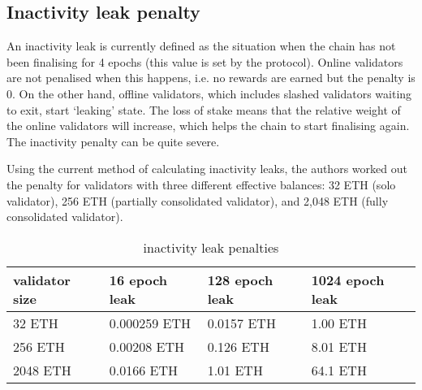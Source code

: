 \documentclass{article}
\begin{document}
\subsection{Inactivity leak penalty}
An inactivity leak is currently defined as the situation when the chain has not
been finalising for 4 epochs (this value is set by the protocol). Online
validators are not penalised when this happens, i.e. no rewards are earned but
the penalty is 0. On the other hand, offline validators, which includes slashed
validators waiting to exit, start `leaking' state. The loss of stake means that
the relative weight of the online validators will increase, which helps the
chain to start finalising again. The inactivity penalty can be quite severe. 

Using the current method of calculating inactivity leaks, the authors worked
out the penalty for validators with three different effective balances: 32 ETH
(solo validator), 256 ETH (partially consolidated validator),  and 2,048 ETH
(fully consolidated validator).

\begin{table}[htp]
\caption{inactivity leak penalties}
\begin{center}
\renewcommand{\arraystretch}{1.3}
\begin{tabular}{|l|l|l|l|}
\hline
\textbf{validator size} & \textbf{16 epoch leak} & \textbf{128 epoch leak} & \textbf{1024 epoch leak} \\
\hline
32 ETH & 0.000259 ETH & 0.0157 ETH & 1.00 ETH \\
256 ETH & 0.00208 ETH & 0.126 ETH & 8.01 ETH \\
2048 ETH & 0.0166 ETH & 1.01 ETH & 64.1 ETH \\
\hline
\end{tabular}
\end{center}
\label{default}
\end{table}%



\end{document}
